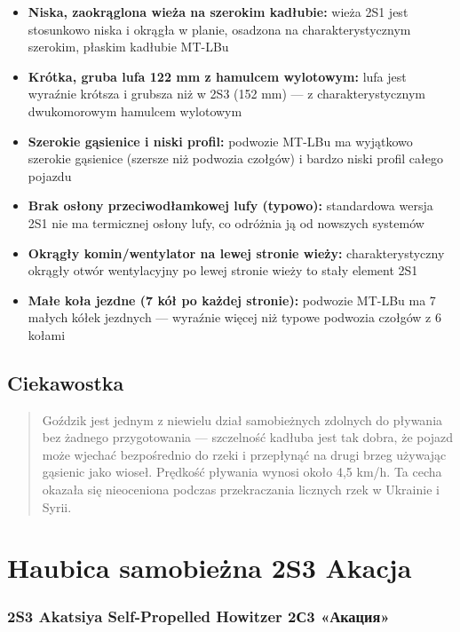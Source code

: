 \documentclass[12pt,oneside]{book}
\providecommand{\tightlist}{%
  \setlength{\itemsep}{0pt}\setlength{\parskip}{0pt}}
\begin{document}
\begin{itemize}
\tightlist
\item
  \textbf{Niska, zaokrąglona wieża na szerokim kadłubie:} wieża 2S1 jest
  stosunkowo niska i okrągła w planie, osadzona na charakterystycznym
  szerokim, płaskim kadłubie MT-LBu
\item
  \textbf{Krótka, gruba lufa 122 mm z hamulcem wylotowym:} lufa jest
  wyraźnie krótsza i grubsza niż w 2S3 (152 mm) --- z charakterystycznym
  dwukomorowym hamulcem wylotowym
\item
  \textbf{Szerokie gąsienice i niski profil:} podwozie MT-LBu ma
  wyjątkowo szerokie gąsienice (szersze niż podwozia czołgów) i bardzo
  niski profil całego pojazdu
\item
  \textbf{Brak osłony przeciwodłamkowej lufy (typowo):} standardowa
  wersja 2S1 nie ma termicznej osłony lufy, co odróżnia ją od nowszych
  systemów
\item
  \textbf{Okrągły komin/wentylator na lewej stronie wieży:}
  charakterystyczny okrągły otwór wentylacyjny po lewej stronie wieży to
  stały element 2S1
\item
  \textbf{Małe koła jezdne (7 kół po każdej stronie):} podwozie MT-LBu
  ma 7 małych kółek jezdnych --- wyraźnie więcej niż typowe podwozia
  czołgów z 6 kołami
\end{itemize}

\subsection{Ciekawostka}\label{ciekawostka-19}

\begin{quote}
Goździk jest jednym z niewielu dział samobieżnych zdolnych do pływania
bez żadnego przygotowania --- szczelność kadłuba jest tak dobra, że
pojazd może wjechać bezpośrednio do rzeki i przepłynąć na drugi brzeg
używając gąsienic jako wioseł. Prędkość pływania wynosi około 4,5 km/h.
Ta cecha okazała się nieoceniona podczas przekraczania licznych rzek w
Ukrainie i Syrii.
\end{quote}

\section{Haubica samobieżna 2S3
Akacja}\label{haubica-samobieux17cna-2s3-akacja}

\subsubsection{2S3 Akatsiya Self-Propelled Howitzer \textbar{} 2С3
«Акация»}\label{s3-akatsiya-self-propelled-howitzer-2ux4413-ux430ux43aux430ux446ux438ux44f}
\end{document}
